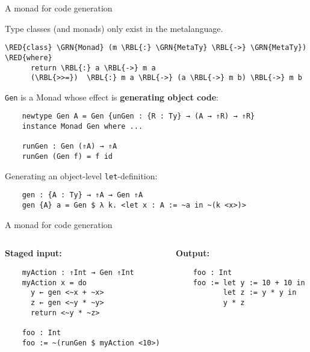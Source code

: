 \documentclass[dvipsnames,aspectratio=169]{beamer}
\newcommand{\ttt}[1]{{\texttt{#1}}}
\theoremstyle{remark}
\newcommand{\RED}[1]{{\color{BrickRed} #1}}
\newcommand{\GRN}[1]{{\color{OliveGreen} #1}}
\newcommand{\RBL}[1]{{\color{RoyalBlue} #1}}
\begin{document}
\begin{frame}[fragile]{A monad for code generation}

Type classes (and monads) only exist in the metalanguage.
\begin{Verbatim}[commandchars=\\\{\}]
    \RED{class} \GRN{Monad} (m \RBL{:} \GRN{MetaTy} \RBL{->} \GRN{MetaTy}) \RED{where}
      return \RBL{:} a \RBL{->} m a
      (\RBL{>>=})  \RBL{:} m a \RBL{->} (a \RBL{->} m b) \RBL{->} m b
\end{Verbatim}
\pause
\ttt{Gen} is a Monad whose effect is \textbf{generating object code}:
\begin{verbatim}
    newtype Gen A = Gen {unGen : {R : Ty} → (A → ⇑R) → ⇑R}
    instance Monad Gen where ...

    runGen : Gen (⇑A) → ⇑A
    runGen (Gen f) = f id
\end{verbatim}
\pause
Generating an object-level \ttt{let}-definition:
\begin{verbatim}
    gen : {A : Ty} → ⇑A → Gen ⇑A
    gen {A} a = Gen $ λ k. <let x : A := ~a in ~(k <x>)>
\end{verbatim}

\end{frame}

\begin{frame}[fragile]{A monad for code generation}

\begin{columns}
\begin{column}{0.4\textwidth}
\textbf{Staged input:}
\begin{verbatim}
    myAction : ⇑Int → Gen ⇑Int
    myAction x = do
      y ← gen <~x + ~x>
      z ← gen <~y * ~y>
      return <~y * ~z>

    foo : Int
    foo := ~(runGen $ myAction <10>)
\end{verbatim}
\end{column}
\begin{column}{0.5\textwidth}
\textbf{Output:}
\begin{verbatim}
    foo : Int
    foo := let y := 10 + 10 in
           let z := y * y in
           y * z




\end{verbatim}
\end{column}
\end{columns}

\end{frame}
\end{document}
